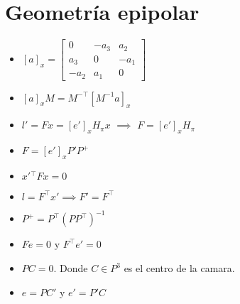 \documentclass[12pt,a4paper]{article}
\begin{document}
\section{Geometr\'ia epipolar}

\begin{itemize}
	\item $[a]_{x} = \left[ {\begin{smallmatrix}
		0 & -a_3 & a_2\\ 
		a_3  & 0 & -a_1\\
		-a_2 & a_1 & 0
		\end{smallmatrix} } \right] $

	\item $[a]_{x}M = M^{-\top}[M^{-1}a]_{x}$

	\item $l' = Fx = [e']_{x} H_{\pi} x$ $\implies$ $F = [e']_{x} H_{\pi}$

	\item $F = [e']_{x} P' P^{+}$

	\item ${x'}{}^{\top}Fx =0$

	\item $l = F^{\top}x' \implies F' = F^{\top}$

	\item $P^{+} = P^{\top}(PP^{\top})^{-1}$

	\item $Fe = 0$ y $F^{\top}e' = 0$

	\item $PC = 0$. Donde $C \in P^{3}$ es el centro de la camara.

	\item $e = PC'$ y $e' = P'C$
\end{itemize}
\end{document}
